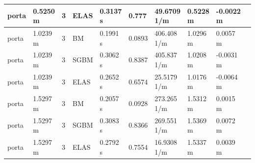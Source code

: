 \documentclass[11pt,a4paper,titlepage]{article}
\begin{document}
\begin{table}[!ht]
\begin{tabular}{@{}llllllllll@{}}
porta & 0.5250 m & 3 & ELAS & 0.3137 s & 0.777 & 49.6709 1/m & 0.5228 m & -0.0022 m \\ \midrule
porta & 1.0239 m & 3 & BM & 0.1991 s & 0.0893 & 406.408 1/m & 1.0296 m & 0.0057 m \\ \midrule
porta & 1.0239 m & 3 & SGBM & 0.3062 s & 0.8387 & 405.837 1/m & 1.0208 m & -0.0031 m \\ \midrule
porta & 1.0239 m & 3 & ELAS & 0.2652 s & 0.6574 & 25.5179 1/m & 1.0176 m & -0.0064 m \\ \midrule
porta & 1.5297 m & 3 & BM & 0.2057 s & 0.0928 & 273.265 1/m & 1.5312 m & 0.0015 m \\ \midrule
porta & 1.5297 m & 3 & SGBM & 0.3083 s & 0.8366 & 269.551 1/m & 1.5369 m & 0.0072 m \\ \midrule
porta & 1.5297 m & 3 & ELAS & 0.2792 s & 0.7554 & 16.9308 1/m & 1.5337 m & 0.0039 m \\ \midrule
\end{tabular}
\end{table}
\end{document}

